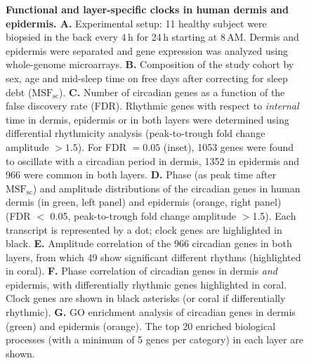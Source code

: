 \begin{figure}%
	\begin{center}
		\caption{\textbf{Functional and layer-specific clocks in human dermis and epidermis. A.} Experimental setup: 11 healthy subject were biopsied in the back every 4\,h for 24\,h starting at 8\,AM. Dermis and epidermis were separated and gene expression was analyzed using whole-genome microarrays.\textbf{ B. }Composition of the study cohort by sex, age and mid-sleep time on free days after correcting for sleep debt ($\textrm{MSF}_\textrm{sc}$). \textbf{C.} Number of circadian genes as a function of the false discovery rate (FDR). Rhythmic genes with respect to \textit{internal} time in dermis, epidermis or in both layers were determined using differential rhythmicity analysis (peak-to-trough fold change amplitude $>1.5$). For FDR $=0.05$ (inset), 1053 genes were found to oscillate with a circadian period in dermis, 1352 in epidermis and 966 were common in both layers. \textbf{D. }Phase (as peak time after $\textrm{MSF}_\textrm{sc}$) and amplitude distributions of the circadian genes in human dermis (in green, left panel) and epidermis (orange, right panel) (FDR $<$ 0.05, peak-to-trough fold change amplitude $>$1.5). Each transcript is represented by a dot; clock genes are highlighted in black. \textbf{E. }Amplitude correlation of the 966 circadian genes in both layers, from which 49 show significant different rhythms (highlighted in coral). \textbf{F. }Phase correlation of circadian genes in dermis \textit{and} epidermis, with differentially rhythmic genes highlighted in coral. Clock genes are shown in black asterisks (or coral if differentially rhythmic). \textbf{G.} GO enrichment analysis of circadian genes in dermis (green) and epidermis (orange). The top 20 enriched biological processes (with a minimum of 5 genes per category) in each layer are shown. } %
		\label{fig:fig1}
	\end{center}
\end{figure}


